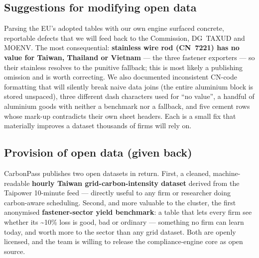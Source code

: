\documentclass[11pt]{article}
\begin{document}
\subsection{Suggestions for modifying open data}
Parsing the EU's adopted tables with our own engine surfaced concrete, reportable defects that we will feed back to the Commission, DG~TAXUD and MOENV. The most consequential: \textbf{stainless wire rod (CN~7221) has no value for Taiwan, Thailand or Vietnam} --- the three fastener exporters --- so their stainless resolves to the punitive fallback; this is most likely a publishing omission and is worth correcting. We also documented inconsistent CN-code formatting that will silently break naive data joins (the entire aluminium block is stored unspaced), three different dash characters used for ``no value'', a handful of aluminium goods with neither a benchmark nor a fallback, and five cement rows whose mark-up contradicts their own sheet headers. Each is a small fix that materially improves a dataset thousands of firms will rely on.

\subsection{Provision of open data (given back)}
CarbonPass publishes two open datasets in return. First, a cleaned, machine-readable \textbf{hourly Taiwan grid-carbon-intensity dataset} derived from the Taipower 10-minute feed --- directly useful to any firm or researcher doing carbon-aware scheduling. Second, and more valuable to the cluster, the first anonymised \textbf{fastener-sector yield benchmark}: a table that lets every firm see whether its \textasciitilde10\% loss is good, bad or ordinary --- something no firm can learn today, and worth more to the sector than any grid dataset. Both are openly licensed, and the team is willing to release the compliance-engine core as open source.
\end{document}
